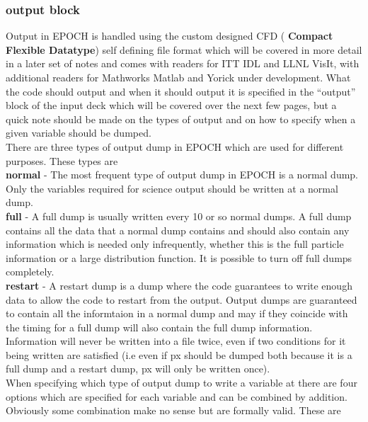 \documentclass[12pt]{article}
\newcommand{\emphtext}{\color{warwickdark} \fontfamily{phv}\selectfont\Large\bf}
\newcommand{\inlineemph}[1]{{\color{warwicklight} \bf{#1}}}
\newcommand{\nEPOCH}{{\color{warwickdark}\fontfamily{phv}\selectfont EPOCH}}
\newcommand{\EPOCH}{{\nEPOCH} }
\begin{document}
\subsubsection{\inlineemph{output} block}
Output in \EPOCH is handled using the custom designed CFD (\inlineemph{Compact
Flexible Datatype}) self defining file format which will be covered in more
detail in a later set of notes and comes with readers for ITT IDL and LLNL
VisIt, with additional readers for Mathworks Matlab and Yorick under
development. What the code should output and when it should output it is
specified in the ``output'' block of the input deck which will be covered over
the next few pages, but a quick note should be made on the types of output and
on how to specify when a given variable should be dumped.\\

There are three types of output dump in \EPOCH which are used for different
purposes. These types are\\

{\emphtext normal} - The most frequent type of output dump in \EPOCH is a
normal dump. Only the variables required for science output should be written
at a normal dump.\\

{\emphtext full} - A full dump is usually written every 10 or so normal
dumps. A full dump contains all the data that a normal dump contains and should
also contain any information which is needed only infrequently, whether this is
the full particle information or a large distribution function. It is possible
to turn off full dumps completely.\\

{\emphtext restart} - A restart dump is a dump where the code guarantees to
write enough data to allow the code to restart from the output. Output dumps
are guaranteed to contain all the informtaion in a normal dump and may if they
coincide with the timing for a full dump will also contain the full dump
information.\\

Information will never be written into a file twice, even if two conditions for
it being written are satisfied (i.e even if px should be dumped both because it
is a full dump and a restart dump, px will only be written once).\\

When specifying which type of output dump to write a variable at there are four
options which are specified for each variable and can be combined by
addition. Obviously some combination make no sense but are formally
valid. These are\\
\end{document}

